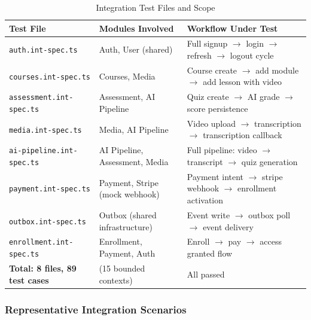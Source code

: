 \begin{table}[H]
  \centering
  \caption{Integration Test Files and Scope}\label{tab:integration-files}
  \small
  \begin{tabular}{@{}p{3.2cm} p{3.2cm} p{\dimexpr\textwidth-7.4cm\relax}@{}}
    \toprule
    \textbf{Test File}                     & \textbf{Modules Involved}         & \textbf{Workflow Under Test} \\
    \midrule
    \rowcolor{green!10}
    \texttt{auth.int-spec.ts}              & Auth, User (shared)               & Full signup $\rightarrow$ login $\rightarrow$ refresh $\rightarrow$ logout cycle \\
    \rowcolor{green!10}
    \texttt{courses.int-spec.ts}           & Courses, Media                    & Course create $\rightarrow$ add module $\rightarrow$ add lesson with video \\
    \rowcolor{green!10}
    \texttt{assessment.int-spec.ts}        & Assessment, AI Pipeline           & Quiz create $\rightarrow$ AI grade $\rightarrow$ score persistence \\
    \rowcolor{green!10}
    \texttt{media.int-spec.ts}             & Media, AI Pipeline                & Video upload $\rightarrow$ transcription $\rightarrow$ transcription callback \\
    \rowcolor{green!10}
    \texttt{ai-pipeline.int-spec.ts}       & AI Pipeline, Assessment, Media    & Full pipeline: video $\rightarrow$ transcript $\rightarrow$ quiz generation \\
    \rowcolor{green!10}
    \texttt{payment.int-spec.ts}           & Payment, Stripe (mock webhook)    & Payment intent $\rightarrow$ stripe webhook $\rightarrow$ enrollment activation \\
    \rowcolor{green!10}
    \texttt{outbox.int-spec.ts}            & Outbox (shared infrastructure)    & Event write $\rightarrow$ outbox poll $\rightarrow$ event delivery \\
    \rowcolor{green!10}
    \texttt{enrollment.int-spec.ts}        & Enrollment, Payment, Auth         & Enroll $\rightarrow$ pay $\rightarrow$ access granted flow \\
    \midrule
    \textbf{Total: 8 files, 89 test cases} & (15 bounded contexts)             & All passed \\
    \bottomrule
  \end{tabular}
\end{table}

\subsubsection{Representative Integration Scenarios}

